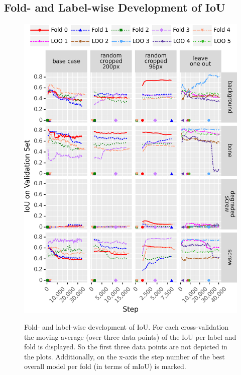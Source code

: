 \subsection{Fold- and Label-wise Development of IoU}
\begin{figure}[!htb]
    \centering
    \includegraphics[width=\textwidth]{pictures/experiment_2/mIoU_labels_folds_separate_base-case_final_base-case_loo_random_cropped_final_random_cropped_res96_final}\\
    \caption[Fold- and Label-wise Development of IoU]{Fold- and label-wise development of IoU. For each cross-validation the moving average (over three data points) of the IoU per label and fold is displayed. So the first three data points are not depicted in the plots. Additionally, on the x-axis the step number of the best overall model per fold (in terms of mIoU) is marked.}
    \label{fig:miou-per-fold-label}
\end{figure}

